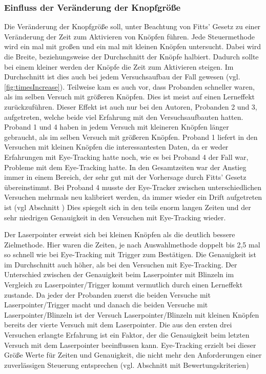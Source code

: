 \subsubsection{Einfluss der Veränderung der Knopfgröße}
Die Veränderung der Knopfgröße soll, unter Beachtung von Fitts' Gesetz zu einer Veränderung der Zeit zum Aktivieren von Knöpfen führen. Jede Steuermethode wird ein mal mit großen und ein mal mit kleinen Knöpfen untersucht. Dabei wird die Breite, beziehungsweise der Durchschnitt der Knöpfe halbiert. Dadurch sollte bei einem kleiner werden der Knöpfe die Zeit zum Aktivieren steigen. Im Durchschnitt ist dies auch bei jedem Versuchsaufbau der Fall gewesen (vgl. \autoref{fig:timesIncrease}). Teilweise kam es auch vor, dass Probanden schneller waren, als im selben Versuch mit größeren Knöpfen. Dies ist meist auf einen Lerneffekt zurückzuführen. Dieser Effekt ist auch nur bei den Autoren, Probanden 2 und 3, aufgetreten, welche beide viel Erfahrung mit den Versuchsaufbauten hatten. Proband 1 und 4 haben in jedem Versuch mit kleineren Knöpfen länger gebraucht, als im selben Versuch mit größeren Knöpfen. Proband 1 liefert in den Versuchen mit kleinen Knöpfen die interessantesten Daten, da er weder Erfahrungen mit Eye-Tracking hatte noch, wie es bei Proband 4 der Fall war, Probleme mit dem Eye-Tracking hatte. In den Gesamtzeiten war der Anstieg immer in einem Bereich, der sehr gut mit der Vorhersage durch Fitts' Gesetz übereinstimmt. Bei Proband 4 musste der Eye-Tracker zwischen unterschiedlichen Versuchen mehrmals neu kalibriert werden, da immer wieder ein Drift aufgetreten ist (vgl Abschnitt ) Dies spiegelt sich in den teils enorm langen Zeiten und der sehr niedrigen Genauigkeit in den Versuchen mit Eye-Tracking wieder. 

Der Laserpointer erweist sich bei kleinen Knöpfen als die deutlich bessere Zielmethode. Hier waren die Zeiten, je nach Auswahlmethode doppelt bis 2,5 mal so schnell wie bei Eye-Tracking mit Trigger zum Bestätigen. Die Genauigkeit ist im Durchschnitt auch höher, als bei den Versuchen mit Eye-Tracking. Der Unterschied zwischen der Genauigkeit beim Laserpointer mit Blinzeln im Vergleich zu Laserpointer/Trigger kommt vermutlich durch einen Lerneffekt zustande. Da jeder der Probanden zuerst die beiden Versuche mit Laserpointer/Trigger macht und danach die beiden Versuche mit Laserpointer/Blinzeln ist der Versuch Laserpointer/Blinzeln mit kleinen Knöpfen bereits der vierte Versuch mit dem Laserpointer. Die aus den ersten drei Versuchen erlangte Erfahrung ist ein Faktor, der die Genauigkeit beim letzten Versuch mit dem Laserpointer beeinflussen kann. Eye-Tracking erzielt bei dieser Größe Werte für Zeiten und Genauigkeit, die nicht mehr den Anforderungen einer zuverlässigen Steuerung entsprechen (vgl. Abschnitt mit Bewertungskriterien)

